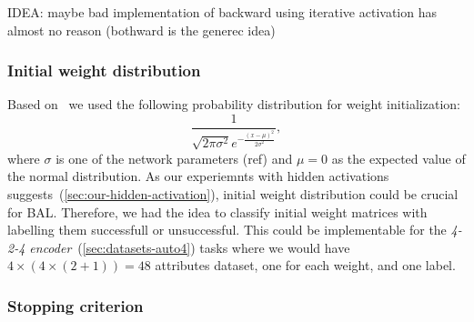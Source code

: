 IDEA: maybe bad implementation of backward
      using iterative activation has almost no reason (bothward is the generec idea) 

\subsubsection*{Initial weight distribution} 
\label{sec:results-sigma} %
\label{sec:our-sigma} 

Based on~\citet{o1996bio} we used the following probability distribution for weight initialization: 
\begin{equation} 
\frac{1}{\sqrt{2\pi \sigma^2} e^{-\frac{(x-\mu)^2}{2\sigma^2}}} \nonumber,
\end{equation} 
where $\sigma$ is one of the network parameters (ref) and $\mu = 0$ as the expected value of the normal distribution. As our experiemnts with hidden activations suggests~(\ref{sec:our-hidden-activation}), initial weight distribution could be crucial for BAL. Therefore, we had the idea to classify initial weight matrices with labelling them successfull or unsuccessful. This could be implementable for the \emph{4-2-4 encoder}~(\ref{sec:datasets-auto4}) tasks where we would have $4\times(4\times(2+1))=48$ attributes dataset, one for each weight, and one label.



\subsubsection*{Stopping criterion}
\label{sec:our-stopping-criteria} 

